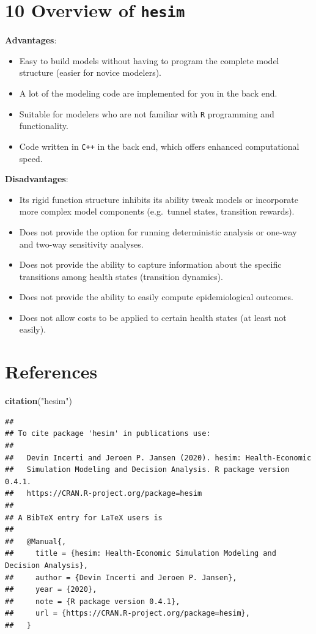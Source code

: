 \documentclass[
]{article}
\newenvironment{Shaded}{\begin{snugshade}}{\end{snugshade}}
\newcommand{\KeywordTok}[1]{\textcolor[rgb]{0.13,0.29,0.53}{\textbf{#1}}}
\newcommand{\NormalTok}[1]{#1}
\newcommand{\StringTok}[1]{\textcolor[rgb]{0.31,0.60,0.02}{#1}}
\begin{document}
\hypertarget{overview-of-hesim}{%
\section{\texorpdfstring{10 Overview of
\texttt{hesim}}{10 Overview of hesim}}\label{overview-of-hesim}}

\textbf{Advantages}:

\begin{itemize}
\item
  Easy to build models without having to program the complete model
  structure (easier for novice modelers).
\item
  A lot of the modeling code are implemented for you in the back end.
\item
  Suitable for modelers who are not familiar with \texttt{R} programming
  and functionality.
\item
  Code written in \texttt{C++} in the back end, which offers enhanced
  computational speed.
\end{itemize}

\textbf{Disadvantages}:

\begin{itemize}
\item
  Its rigid function structure inhibits its ability tweak models or
  incorporate more complex model components (e.g.~tunnel states,
  transition rewards).
\item
  Does not provide the option for running deterministic analysis or
  one-way and two-way sensitivity analyses.
\item
  Does not provide the ability to capture information about the specific
  transitions among health states (transition dynamics).
\item
  Does not provide the ability to easily compute epidemiological
  outcomes.
\item
  Does not allow costs to be applied to certain health states (at least
  not easily).
\end{itemize}

\hypertarget{references}{%
\section{References}\label{references}}

\begin{Shaded}
\begin{Highlighting}[]
\KeywordTok{citation}\NormalTok{(}\StringTok{"hesim"}\NormalTok{)}
\end{Highlighting}
\end{Shaded}

\begin{verbatim}
## 
## To cite package 'hesim' in publications use:
## 
##   Devin Incerti and Jeroen P. Jansen (2020). hesim: Health-Economic
##   Simulation Modeling and Decision Analysis. R package version 0.4.1.
##   https://CRAN.R-project.org/package=hesim
## 
## A BibTeX entry for LaTeX users is
## 
##   @Manual{,
##     title = {hesim: Health-Economic Simulation Modeling and Decision Analysis},
##     author = {Devin Incerti and Jeroen P. Jansen},
##     year = {2020},
##     note = {R package version 0.4.1},
##     url = {https://CRAN.R-project.org/package=hesim},
##   }
\end{verbatim}
\end{document}
